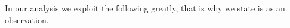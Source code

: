 \documentclass[a4paper,UKenglish,cleveref, autoref, thm-restate]{lipics-v2021}
\newcommand{\deltaExact}{\textsc{Simple TGR}}
\begin{document}



In our analysis we exploit the following greatly, that is why we state is as an observation.
\end{document}
